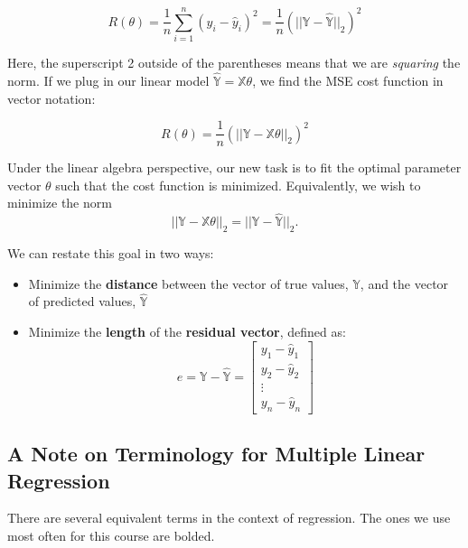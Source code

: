 \documentclass[
  letterpaper,
  DIV=11,
  numbers=noendperiod]{scrreprt}
\providecommand{\tightlist}{%
  \setlength{\itemsep}{0pt}\setlength{\parskip}{0pt}}\usepackage{longtable,booktabs,array}
\begin{document}
\[R(\theta) = \frac{1}{n} \sum_{i=1}^n (y_i - \hat{y}_i)^2 = \frac{1}{n} (||\mathbb{Y} - \hat{\mathbb{Y}}||_2)^2\]

Here, the superscript 2 outside of the parentheses means that we are
\emph{squaring} the norm. If we plug in our linear model
\(\hat{\mathbb{Y}} = \mathbb{X} \theta\), we find the MSE cost function
in vector notation:

\[R(\theta) = \frac{1}{n} (||\mathbb{Y} - \mathbb{X} \theta||_2)^2\]

Under the linear algebra perspective, our new task is to fit the optimal
parameter vector \(\theta\) such that the cost function is minimized.
Equivalently, we wish to minimize the norm
\[||\mathbb{Y} - \mathbb{X} \theta||_2 = ||\mathbb{Y} - \hat{\mathbb{Y}}||_2.\]

We can restate this goal in two ways:

\begin{itemize}
\tightlist
\item
  Minimize the \textbf{distance} between the vector of true values,
  \(\mathbb{Y}\), and the vector of predicted values,
  \(\mathbb{\hat{Y}}\)
\item
  Minimize the \textbf{length} of the \textbf{residual vector}, defined
  as: \[e = \mathbb{Y} - \mathbb{\hat{Y}} = \begin{bmatrix}
           y_1 - \hat{y}_1 \\
           y_2 - \hat{y}_2 \\
           \vdots \\
           y_n - \hat{y}_n
         \end{bmatrix}\]
\end{itemize}

\subsection{A Note on Terminology for Multiple Linear
Regression}\label{a-note-on-terminology-for-multiple-linear-regression}

There are several equivalent terms in the context of regression. The
ones we use most often for this course are bolded.
\end{document}
